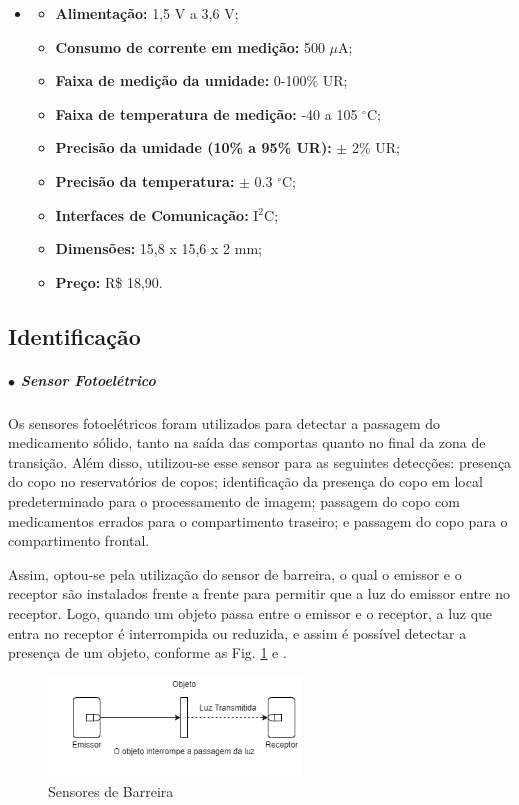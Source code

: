     \begin{itemize}
    \item[]
        \begin{itemize}
            \item \textbf{Alimentação:} 1,5 V a 3,6 V;
            \item \textbf{Consumo de corrente em medição:} 500 $\mu$A;
            \item \textbf{Faixa de medição da umidade:} 0-100\% UR;
            \item \textbf{Faixa de temperatura de medição:} -40 a 105 $^\circ$C;
            \item \textbf{Precisão da umidade (10\% a 95\% UR):}  $\pm$ 2\% UR;
            \item \textbf{Precisão da temperatura:} $\pm$ 0.3 $^\circ$C;
            \item \textbf{Interfaces de Comunicação:} I$^2$C;
            \item \textbf{Dimensões:} 15,8 x 15,6 x 2 mm;
            \item \textbf{Preço:} R\$ 18,90.
        \end{itemize}
    \end{itemize}
    
\subsection{Identificação}
    \subparagraph*{$\bullet$ Sensor Fotoelétrico} \hfill
    
    Os sensores fotoelétricos foram utilizados para detectar a passagem do medicamento sólido, tanto na saída das comportas quanto no final da zona de transição. Além disso, utilizou-se esse sensor para as seguintes detecções: presença do copo no reservatórios de copos; identificação da presença do copo em local predeterminado para o processamento de imagem; passagem do copo com medicamentos errados para o compartimento traseiro; e passagem do copo para o compartimento frontal.
    
    Assim, optou-se pela utilização do sensor de barreira, o qual o emissor e o receptor são instalados frente a frente para permitir que a luz do emissor entre no receptor. Logo, quando um objeto passa entre o emissor e o receptor, a luz que entra no receptor é interrompida ou reduzida, e assim é possível detectar a presença de um objeto, conforme as Fig. \ref{fig:sensor_infra} e  \cite{amron_photo_sensors}.
    
    \begin{figure}[H]
        \centering
        \includegraphics[width=0.6\textwidth]{figuras/eletronica/fotos_componentes/sensor_infra.png}
        \caption{Sensores de Barreira}
        \label{fig:sensor_infra}
    \end{figure}
    
